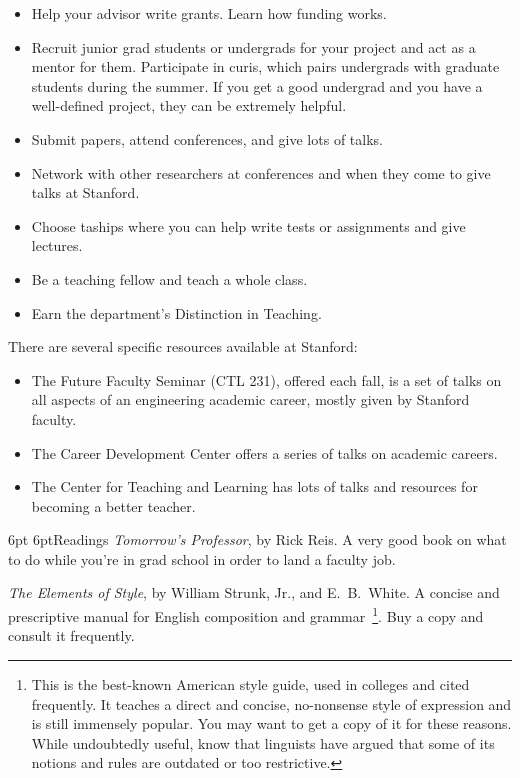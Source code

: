 \documentclass[10pt]{book}
\makeatletter
\renewcommand{\subsection}{\@startsection{subsection}{2}{0mm}%
   {6pt}%
   {6pt}{\normalfont\normalsize\itshape}}
\makeatother
\begin{document}
\begin{itemize}
\item Help your advisor write grants.  Learn how funding works.
\item Recruit junior grad students or undergrads for your project and act as a
mentor for them. Participate in {\sc curis}, which pairs
undergrads with graduate students during the summer. If you get a good
undergrad and you have a well-defined project, they can be extremely helpful.

\item Submit papers, attend conferences, and give lots of talks.

\item Network with other researchers at conferences and when they come to give
talks at Stanford.

\item Choose {\sc ta}ships where you can help write tests or assignments and
give lectures.

\item Be a teaching fellow and teach a whole class.

\item Earn the department's Distinction in Teaching.
\end{itemize}

There are several specific resources available at Stanford:

\begin{itemize}
\item The Future Faculty Seminar ({\sc CTL} 231), offered each fall, is a set of
talks on all aspects of an engineering academic career, mostly given by
Stanford faculty.

\item The Career Development Center offers a series of talks on academic
careers.

\item The Center for Teaching and Learning has lots of talks and resources for
becoming a better teacher.
\end{itemize}

\subsection{Readings}
{\it Tomorrow's Professor}, by Rick Reis. A very good book on what to do while
you're in grad school in order to land a faculty job.

{\it The Elements of Style}, by William Strunk, Jr., and E.\ B.\ White. A concise and prescriptive manual for English composition and grammar~\footnote{This is the best-known American style guide, used in colleges and cited frequently. It teaches a direct and concise, no-nonsense style of expression and is still immensely popular. You may want to get a copy of it for these reasons. While undoubtedly useful, know that linguists have argued that some of its notions and rules are outdated or too restrictive.}. Buy a copy and consult it frequently.  
\end{document}
